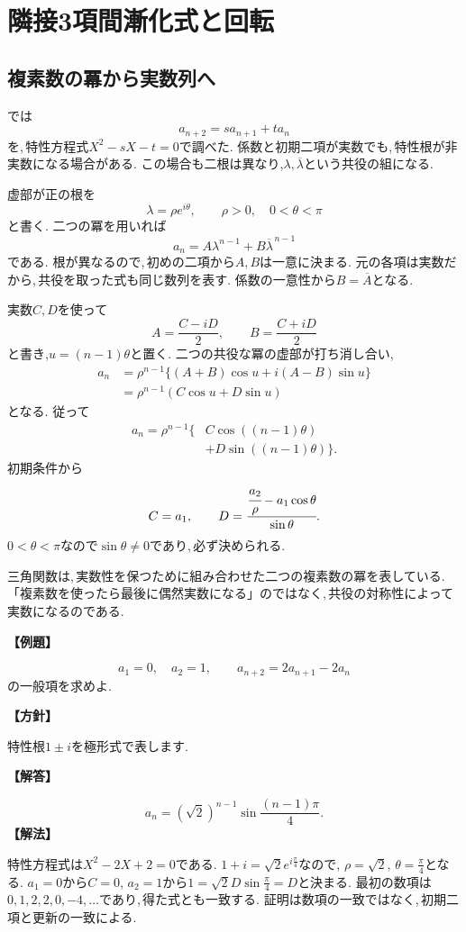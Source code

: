 \section{隣接3項間漸化式と回転}\label{節：隣接3項間漸化式と回転}
\subsection{複素数の冪から実数列へ}

では
\[
 a_{n+2}=s a_{n+1}+t a_n
\]
を,\,特性方程式$X^2-sX-t=0$で調べた.
係数と初期二項が実数でも,\,特性根が非実数になる場合がある.
この場合も二根は異なり,$\lambda,\overline\lambda$という共役の組になる.

虚部が正の根を
\[
 \lambda=\rho e^{i\theta},
 \qquad \rho>0,\quad 0<\theta<\pi
\]
と書く.
二つの冪を用いれば
\[
 a_n=A\lambda^{n-1}+B\overline\lambda^{\,n-1}
\]
である.
根が異なるので,\,初めの二項から$A,B$は一意に決まる.
元の各項は実数だから,\,共役を取った式も同じ数列を表す.
係数の一意性から$B=\overline A$となる.

実数$C,D$を使って
\[
 A=\frac{C-iD}{2},\qquad B=\frac{C+iD}{2}
\]
と書き,$u=(n-1)\theta$と置く.
二つの共役な冪の虚部が打ち消し合い,
\[
 \begin{aligned}
 a_n
 &=\rho^{n-1}\{(A+B)\cos u+i(A-B)\sin u\}\\
 &=\rho^{n-1}(C\cos u+D\sin u)
 \end{aligned}
\]
となる.
従って
\[
 \begin{aligned}
 a_n=\rho^{n-1}\{&
 C\cos((n-1)\theta)\\
 &+D\sin((n-1)\theta)\}.
 \end{aligned}
\]
初期条件から
\[
 C=a_1,\qquad
 D=\cfrac{\cfrac{a_2}{\rho}-a_1\cos\theta}{\sin\theta}.
\]
$0<\theta<\pi$なので$\sin\theta\ne0$であり,\,必ず決められる.

三角関数は,\,実数性を保つために組み合わせた二つの複素数の冪を表している.
「複素数を使ったら最後に偶然実数になる」のではなく,\,共役の対称性によって実数になるのである.

\noindent\textbf{【例題】}\par\nobreak
\[
 a_1=0,\quad a_2=1,\qquad
 a_{n+2}=2a_{n+1}-2a_n
\]
の一般項を求めよ.

\noindent\textbf{【方針】}\par\nobreak
特性根$1\pm i$を極形式で表します.

\noindent\textbf{【解答】}\par\nobreak
\[
 a_n=(\sqrt2)^{n-1}\sin\frac{(n-1)\pi}{4}.
\]
\noindent\textbf{【解法】}\par\nobreak
特性方程式は$X^2-2X+2=0$である.
$1+i=\sqrt2e^{i\frac{\pi}{4}}$なので,
$\rho=\sqrt2,\,\theta=\frac{\pi}{4}$となる.
$a_1=0$から$C=0$,
$a_2=1$から$1=\sqrt2D\sin\frac{\pi}{4}=D$と決まる.
最初の数項は$0,1,2,2,0,-4,\ldots$であり,\,得た式とも一致する.
証明は数項の一致ではなく,\,初期二項と更新の一致による.

